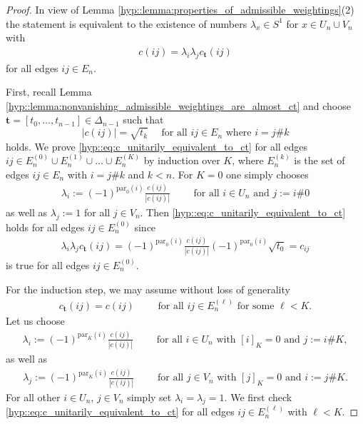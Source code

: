 \documentclass[a4paper]{amsart}
\begin{document}
\begin{proof}
    In view of Lemma \ref{hyp::lemma:properties_of_admissible_weightings}(2) the statement is equivalent to the existence of numbers $\lambda_x \in S^1$ for $x \in U_n \cup V_n$ with
    \begin{align}
        \label{hyp::eq:c_unitarily_equivalent_to_ct}
        c(ij) = \lambda_i \lambda_j c_\mathbf{t}(ij) %
    \end{align}
    for all edges $ij \in E_n$.

    First, recall Lemma \ref{hyp::lemma:nonvanishing_admissible_weightings_are_almost_ct} and choose $\mathbf{t} = [t_0, \dots, t_{n-1}] \in \Delta_{n-1}$ such that 
    $$
    |c(ij)| = \sqrt{t_k} \quad \text{ for all } ij \in E_n \text{ where } i = j \# k
    $$
    holds.
    We prove \eqref{hyp::eq:c_unitarily_equivalent_to_ct} for all edges $ij \in E_n^{(0)} \cup E_n^{(1)} \cup \dots \cup E_n^{(K)}$ by induction over $K$, where $E_n^{(k)}$ is the set of edges $ij \in E_n$ with $i = j \# k$ and $k < n$. For $K=0$ one simply chooses 
    \begin{align*}
        \lambda_i := (-1)^{\mathrm{par}_0(i)} \frac{c(ij)}{|c(ij)|} \qquad \text{ for all } i \in U_n \text{ and } j := i \# 0
    \end{align*}
    as well as $\lambda_j := 1$ for all $j \in V_n$. Then \eqref{hyp::eq:c_unitarily_equivalent_to_ct} holds for all edges $ij \in E_n^{(0)}$ since 
    \begin{align*}
        \lambda_i \lambda_j c_\mathbf{t}(ij) = (-1)^{\mathrm{par}_0(i)}  \frac{c(ij)}{|c(ij)|} (-1)^{\mathrm{par}_0(i)} \sqrt{t_0} = c_{ij}
    \end{align*}
    is true for all edges $ij \in E_n^{(0)}$.

    For the induction step, we may
    assume without loss of generality
    \begin{align*}
        c_\mathbf{t}(ij) = c(ij) \qquad \text{ for all } ij \in E_n^{(\ell)} \text{ for some } \ell < K.
    \end{align*}
    Let us choose
    \begin{align*}
        \lambda_i := (-1)^{\mathrm{par}_K(i)} \frac{c(ij)}{|c(ij)|} \qquad \text{ for all } i \in U_n \text{ with } [i]_K = 0 \text{ and } j := i \# K,
    \end{align*}
    as well as
    \begin{align*}
        \lambda_j := (-1)^{\mathrm{par}_K(i)} \frac{c(ij)}{|c(ij)|} \qquad \text{ for all } j \in V_n \text{ with } [j]_K = 0 \text{ and } i := j \# K.
    \end{align*}
    For all other $i \in  U_n$, $j \in V_n$ simply set $\lambda_i = \lambda_j = 1$. We first check \eqref{hyp::eq:c_unitarily_equivalent_to_ct} for all edges $ij \in E_n^{(\ell)}$ with $\ell < K$. 
    

\end{proof}
\end{document}
